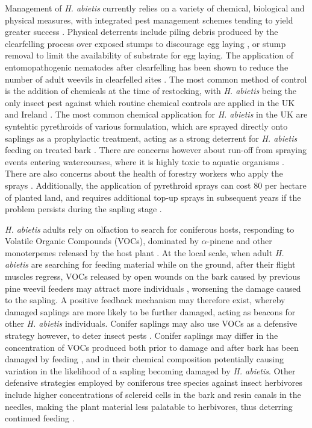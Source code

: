 \documentclass[a4paper, 11pt]{article}
\newcommand{\textapprox}{\raisebox{0.5ex}{\texttildelow}}
\begin{document}
Management of \textit{H. abietis} currently relies on a variety of chemical, biological and physical measures, with integrated pest management schemes tending to yield greater success \citep{Willoughby2004}. Physical deterrents include piling debris produced by the clearfelling process over exposed stumps to discourage egg laying \citep{Rahman2015}, or stump removal to limit the availability of substrate for egg laying. The application of entomopathogenic nematodes after clearfelling has been shown to reduce the number of adult weevils in clearfelled sites \citep{Dillon2006, Kapranas2017, Williams2013}. The most common method of control is the addition of chemicals at the time of restocking, with \textit{H. abietis} being the only insect pest against which routine chemical controls are applied in the UK and Ireland \citep{Willoughby2004, Willoughby2017}. The most common chemical application for \textit{H. abietis} in the UK are syntehtic pyrethroids of various formulation, which are sprayed directly onto saplings as a prophylactic treatment, acting as a strong deterrent for \textit{H. abietis} feeding on treated bark \citep{Rose2005}. There are concerns however about run-off from spraying events entering watercourses, where it is highly toxic to aquatic organisms \citep{Willoughby2017, Mian1992, Antwi2015}. There are also concerns about the health of forestry workers who apply the sprays \citep{Rose2002}. Additionally, the application of pyrethroid sprays can cost \textapprox{}\textsterling{}80 per hectare of planted land, and requires additional top-up sprays in subsequent years if the problem persists during the sapling stage \citep{Willoughby2017}.  

\textit{H. abietis} adults rely on olfaction to search for coniferous hosts, responding to Volatile Organic Compounds (VOCs), dominated by $\alpha$-pinene and other monoterpenes released by the host plant \citep{Nordlander1986, Nordlander1987}. At the local scale, when adult \textit{H. abietis} are searching for feeding material while on the ground, after their flight muscles regress, VOCs released by open wounds on the bark caused by previous pine weevil feeders may attract more individuals \citep{Nordlander1987, Tilles1986}, worsening the damage caused to the sapling. A positive feedback mechanism may therefore exist, whereby damaged saplings are more likely to be further damaged, acting as beacons for other \textit{H. abietis} individuals. Conifer saplings may also use VOCs as a defensive strategy however, to deter insect pests \citep{Gershenzon1991, Trapp2001}. Conifer saplings may differ in the concentration of VOCs produced both prior to damage and after bark has been damaged by feeding \citep{Kivimaenpaa2012, Keeling2006}, and in their chemical composition \citep{Heijari2011} potentially causing variation in the likelihood of a sapling becoming damaged by \textit{H. abietis}. Other defensive strategies employed by coniferous tree species against insect herbivores include higher concentrations of sclereid cells in the bark and resin canals in the needles, making the plant material less palatable to herbivores, thus deterring continued feeding \citep{Donnelly2016, King2011}.
\end{document}
